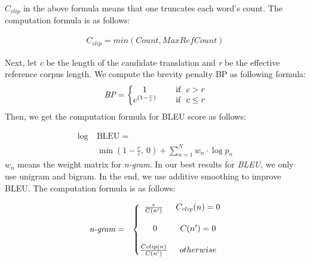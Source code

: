 \documentclass[11pt]{article}
\begin{document}
$C_{clip}$ in the above formula means that one truncates each word’s count. The computation formula is as follows:

\begin{equation}
\begin{aligned}
C_{clip}=min(Count,Max Re f Count)
\end{aligned}
\end{equation}

Next, let  \emph{c} be the length of the candidate translation
and  \emph{r} be the effective reference corpus length.
We compute the brevity penalty BP as following formula:
\begin{equation}
\begin{aligned}
 \emph{BP} = \left\{\begin{matrix}
1 &  &\mbox{ if }\ {c > r}\\ 
e^{(1-\frac{r}{c})} &  &\mbox{ if }\ {c \leq r}
\end{matrix}\right. 
\end{aligned}
\end{equation}
Then, we get the computation formula for BLEU score as follows:

\begin{equation}
\begin{aligned}
\log\ & \mathrm{BLEU} = \\
& \min \left ( 1- \frac{r}{c},\ 0 \right ) + \sum^N_{n=1}w_{n}\cdot \log p_{n}
\end{aligned}
\end{equation}
$w_{n}$ means the weight matrix for \emph{n-gram}. In our best results for \emph{BLEU}, we only use unigram and bigram. In the end, we use additive smoothing to improve BLEU. The computation formula is as follows:

\begin{equation}
\begin{aligned}
& \emph{n-gram}=& \left\{\begin{matrix}
\frac{\epsilon}{C(n')} & {C_{clip}(n) = 0}\\
\\
\ 0 & {C(n')=0 } \\
\\
\frac{C{clip}(n)}{C(n')} & otherwise\\
\end{matrix}\right.
\end{aligned}
\end{equation}
\end{document}
